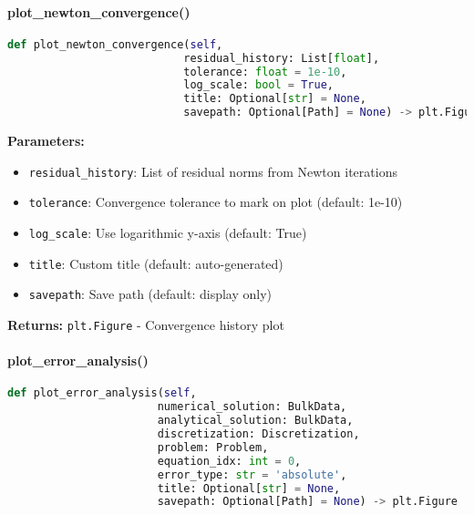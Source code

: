 \paragraph{plot\_newton\_convergence()}\leavevmode
\begin{lstlisting}[language=Python, caption=Expected Newton Convergence Plotting Method]
def plot_newton_convergence(self,
                           residual_history: List[float],
                           tolerance: float = 1e-10,
                           log_scale: bool = True,
                           title: Optional[str] = None,
                           savepath: Optional[Path] = None) -> plt.Figure
\end{lstlisting}

\textbf{Parameters:}
\begin{itemize}
    \item \texttt{residual\_history}: List of residual norms from Newton iterations
    \item \texttt{tolerance}: Convergence tolerance to mark on plot (default: 1e-10)
    \item \texttt{log\_scale}: Use logarithmic y-axis (default: True)
    \item \texttt{title}: Custom title (default: auto-generated)
    \item \texttt{savepath}: Save path (default: display only)
\end{itemize}

\textbf{Returns:} \texttt{plt.Figure} - Convergence history plot

\paragraph{plot\_error\_analysis()}\leavevmode
\begin{lstlisting}[language=Python, caption=Expected Error Analysis Method]
def plot_error_analysis(self,
                       numerical_solution: BulkData,
                       analytical_solution: BulkData,
                       discretization: Discretization,
                       problem: Problem,
                       equation_idx: int = 0,
                       error_type: str = 'absolute',
                       title: Optional[str] = None,
                       savepath: Optional[Path] = None) -> plt.Figure
\end{lstlisting}

